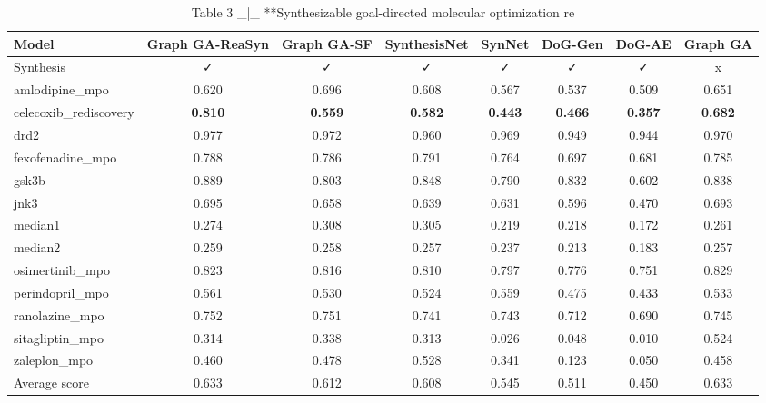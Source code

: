 \begin{table}[t]
\centering
\caption{Table 3 \_|\_ **Synthesizable goal-directed molecular optimization re}
\label{tab:2509.16084}
\begin{tabular}{lccccccc}
\toprule
Model & Graph GA-ReaSyn & Graph GA-SF & SynthesisNet & SynNet & DoG-Gen & DoG-AE & Graph GA \\
\midrule
Synthesis & ✓ & ✓ & ✓ & ✓ & ✓ & ✓ & x \\
amlodipine\_mpo & 0.620 & 0.696 & 0.608 & 0.567 & 0.537 & 0.509 & 0.651 \\
celecoxib\_rediscovery & \textbf{0.810} & \textbf{0.559} & \textbf{0.582} & \textbf{0.443} & \textbf{0.466} & \textbf{0.357} & \textbf{0.682} \\
drd2 & 0.977 & 0.972 & 0.960 & 0.969 & 0.949 & 0.944 & 0.970 \\
fexofenadine\_mpo & 0.788 & 0.786 & 0.791 & 0.764 & 0.697 & 0.681 & 0.785 \\
gsk3b & 0.889 & 0.803 & 0.848 & 0.790 & 0.832 & 0.602 & 0.838 \\
jnk3 & 0.695 & 0.658 & 0.639 & 0.631 & 0.596 & 0.470 & 0.693 \\
median1 & 0.274 & 0.308 & 0.305 & 0.219 & 0.218 & 0.172 & 0.261 \\
median2 & 0.259 & 0.258 & 0.257 & 0.237 & 0.213 & 0.183 & 0.257 \\
osimertinib\_mpo & 0.823 & 0.816 & 0.810 & 0.797 & 0.776 & 0.751 & 0.829 \\
perindopril\_mpo & 0.561 & 0.530 & 0.524 & 0.559 & 0.475 & 0.433 & 0.533 \\
ranolazine\_mpo & 0.752 & 0.751 & 0.741 & 0.743 & 0.712 & 0.690 & 0.745 \\
sitagliptin\_mpo & 0.314 & 0.338 & 0.313 & 0.026 & 0.048 & 0.010 & 0.524 \\
zaleplon\_mpo & 0.460 & 0.478 & 0.528 & 0.341 & 0.123 & 0.050 & 0.458 \\
Average score & 0.633 & 0.612 & 0.608 & 0.545 & 0.511 & 0.450 & 0.633 \\
\bottomrule
\end{tabular}
\end{table}
